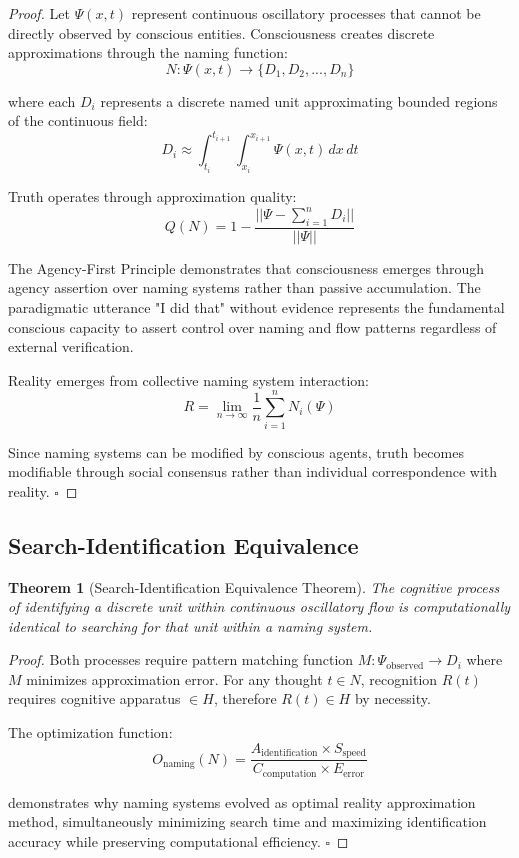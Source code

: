 \documentclass[12pt,a4paper]{article}
\newtheorem{theorem}{Theorem}[section]
\begin{document}
\begin{proof}
Let $\Psi(x,t)$ represent continuous oscillatory processes that cannot be directly observed by conscious entities. Consciousness creates discrete approximations through the naming function:
$$N: \Psi(x,t) \rightarrow \{D_1, D_2, ..., D_n\}$$

where each $D_i$ represents a discrete named unit approximating bounded regions of the continuous field:
$$D_i \approx \int_{t_i}^{t_{i+1}} \int_{x_i}^{x_{i+1}} \Psi(x,t) \, dx \, dt$$

Truth operates through approximation quality:
$$Q(N) = 1 - \frac{||\Psi - \sum_{i=1}^{n} D_i||}{||\Psi||}$$

The Agency-First Principle demonstrates that consciousness emerges through agency assertion over naming systems rather than passive accumulation. The paradigmatic utterance "I did that" without evidence represents the fundamental conscious capacity to assert control over naming and flow patterns regardless of external verification.

Reality emerges from collective naming system interaction:
$$R = \lim_{n \to \infty} \frac{1}{n} \sum_{i=1}^{n} N_i(\Psi)$$

Since naming systems can be modified by conscious agents, truth becomes modifiable through social consensus rather than individual correspondence with reality. $\square$
\end{proof}

\subsection{Search-Identification Equivalence}

\begin{theorem}[Search-Identification Equivalence Theorem]
The cognitive process of identifying a discrete unit within continuous oscillatory flow is computationally identical to searching for that unit within a naming system.
\end{theorem}

\begin{proof}
Both processes require pattern matching function $M: \Psi_{\text{observed}} \rightarrow D_i$ where $M$ minimizes approximation error. For any thought $t \in N$, recognition $R(t)$ requires cognitive apparatus $\in H$, therefore $R(t) \in H$ by necessity.

The optimization function:
$$O_{\text{naming}}(N) = \frac{A_{\text{identification}} \times S_{\text{speed}}}{C_{\text{computation}} \times E_{\text{error}}}$$

demonstrates why naming systems evolved as optimal reality approximation method, simultaneously minimizing search time and maximizing identification accuracy while preserving computational efficiency. $\square$
\end{proof}
\end{document}
